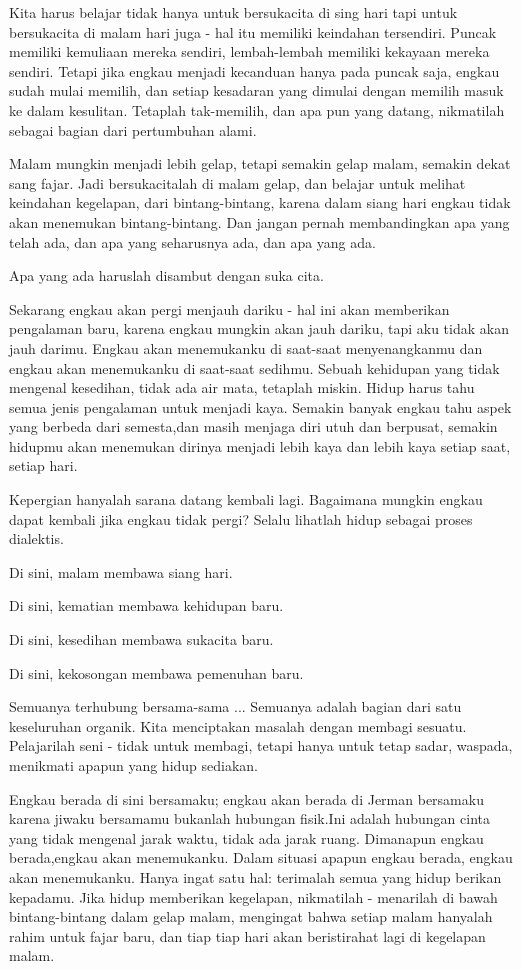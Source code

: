 Kita harus belajar tidak hanya untuk bersukacita di sing hari tapi untuk bersukacita di malam hari juga - hal itu memiliki keindahan tersendiri.
Puncak memiliki kemuliaan mereka sendiri, lembah-lembah memiliki kekayaan mereka sendiri.
Tetapi jika engkau menjadi kecanduan hanya pada puncak saja, engkau sudah mulai memilih, dan setiap kesadaran yang dimulai dengan memilih
masuk ke dalam kesulitan. Tetaplah tak-memilih, dan apa pun yang datang, nikmatilah sebagai bagian dari pertumbuhan alami.

Malam mungkin menjadi lebih gelap, tetapi semakin gelap malam, semakin dekat sang fajar. Jadi bersukacitalah di malam gelap, dan belajar untuk
melihat keindahan kegelapan, dari bintang-bintang, karena dalam siang hari engkau tidak akan menemukan bintang-bintang.
Dan jangan pernah membandingkan apa yang telah ada, dan apa yang seharusnya ada, dan apa yang ada.

Apa yang ada haruslah disambut dengan suka cita.

Sekarang engkau akan pergi menjauh dariku - hal ini akan memberikan pengalaman baru, karena engkau mungkin akan jauh dariku,
tapi aku tidak akan jauh darimu. Engkau akan menemukanku di saat-saat menyenangkanmu dan engkau akan menemukanku di saat-saat sedihmu.
Sebuah kehidupan yang tidak mengenal kesedihan, tidak ada air mata, tetaplah miskin. Hidup harus tahu semua jenis pengalaman untuk menjadi kaya.
Semakin banyak engkau tahu aspek yang berbeda dari semesta,dan masih menjaga diri utuh dan berpusat, semakin hidupmu akan menemukan dirinya
menjadi lebih kaya dan lebih kaya setiap saat, setiap hari.

Kepergian hanyalah sarana datang kembali lagi. Bagaimana mungkin engkau dapat kembali jika engkau tidak pergi?
Selalu lihatlah hidup sebagai proses dialektis.

Di sini, malam membawa siang hari.\par
Di sini, kematian membawa kehidupan baru.\par
Di sini, kesedihan membawa sukacita baru.\par
Di sini, kekosongan membawa pemenuhan baru.\par

Semuanya terhubung bersama-sama ... Semuanya adalah bagian dari satu keseluruhan organik. Kita menciptakan masalah dengan membagi
sesuatu. Pelajarilah seni - tidak untuk membagi, tetapi hanya untuk tetap sadar, waspada, menikmati apapun yang hidup sediakan.

Engkau berada di sini bersamaku; engkau akan berada di Jerman bersamaku karena jiwaku bersamamu bukanlah hubungan fisik.Ini adalah
hubungan cinta yang tidak mengenal jarak waktu, tidak ada jarak ruang. Dimanapun engkau berada,engkau akan menemukanku. Dalam situasi apapun
engkau berada, engkau akan menemukanku. Hanya ingat satu hal: terimalah semua yang hidup berikan kepadamu. Jika hidup
memberikan kegelapan, nikmatilah - menarilah di bawah bintang-bintang dalam gelap malam, mengingat bahwa setiap malam hanyalah rahim
untuk fajar baru, dan tiap tiap hari akan beristirahat lagi di kegelapan malam.

